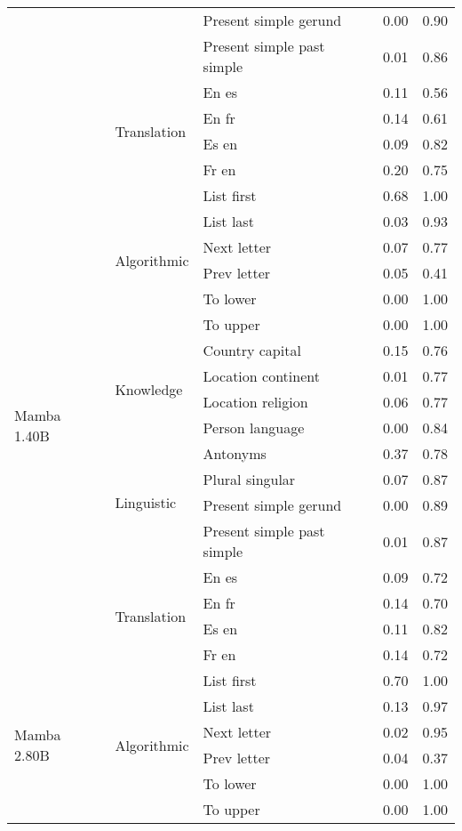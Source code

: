 \begin{center}
\begin{longtable}{lllrr}
 &  & Present simple gerund & 0.00 & 0.90 \\
 &  & Present simple past simple & 0.01 & 0.86 \\
\cline{2-5}
 & \multirow[t]{4}{*}{Translation} & En es & 0.11 & 0.56 \\
 &  & En fr & 0.14 & 0.61 \\
 &  & Es en & 0.09 & 0.82 \\
 &  & Fr en & 0.20 & 0.75 \\
\cline{1-5} \cline{2-5}
\multirow[t]{18}{*}{Mamba 1.40B} & \multirow[t]{6}{*}{Algorithmic} & List first & 0.68 & 1.00 \\
 &  & List last & 0.03 & 0.93 \\
 &  & Next letter & 0.07 & 0.77 \\
 &  & Prev letter & 0.05 & 0.41 \\
 &  & To lower & 0.00 & 1.00 \\
 &  & To upper & 0.00 & 1.00 \\
\cline{2-5}
 & \multirow[t]{4}{*}{Knowledge} & Country capital & 0.15 & 0.76 \\
 &  & Location continent & 0.01 & 0.77 \\
 &  & Location religion & 0.06 & 0.77 \\
 &  & Person language & 0.00 & 0.84 \\
\cline{2-5}
 & \multirow[t]{4}{*}{Linguistic} & Antonyms & 0.37 & 0.78 \\
 &  & Plural singular & 0.07 & 0.87 \\
 &  & Present simple gerund & 0.00 & 0.89 \\
 &  & Present simple past simple & 0.01 & 0.87 \\
\cline{2-5}
 & \multirow[t]{4}{*}{Translation} & En es & 0.09 & 0.72 \\
 &  & En fr & 0.14 & 0.70 \\
 &  & Es en & 0.11 & 0.82 \\
 &  & Fr en & 0.14 & 0.72 \\
\cline{1-5} \cline{2-5}
\multirow[t]{18}{*}{Mamba 2.80B} & \multirow[t]{6}{*}{Algorithmic} & List first & 0.70 & 1.00 \\
 &  & List last & 0.13 & 0.97 \\
 &  & Next letter & 0.02 & 0.95 \\
 &  & Prev letter & 0.04 & 0.37 \\
 &  & To lower & 0.00 & 1.00 \\
 &  & To upper & 0.00 & 1.00 \\
\cline{2-5}

\end{longtable}
\end{center}
